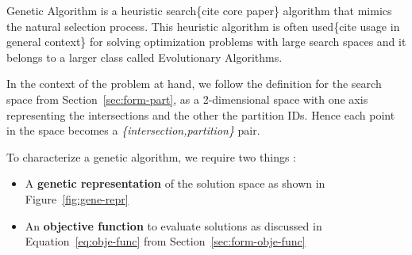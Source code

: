 \begin{scriptsize}
\begin{algorithm}[ht!]
\end{algorithm}
\end{scriptsize}

Genetic Algorithm is a heuristic search\{cite core paper\} algorithm that mimics the natural selection process. This heuristic algorithm is often used\{cite usage in general context\} for solving optimization problems with large search spaces and it belongs to a larger class called Evolutionary Algorithms.

In the context of the problem at hand, we follow the definition for the search space from Section~\ref{sec:form-part}, as a 2-dimensional space with one axis representing the intersections and the other the partition IDs. Hence each point in the space becomes a \textit{\{intersection,partition\}} pair.

\noindent To characterize a genetic algorithm, we require two things :
\begin{itemize}
	\item A \textbf{genetic representation} of the solution space as shown in Figure~\ref{fig:gene-repr}
	\item An \textbf{objective function} to evaluate solutions as discussed in Equation~\ref{eq:obje-func} from Section~\ref{sec:form-obje-func}
\end{itemize}

